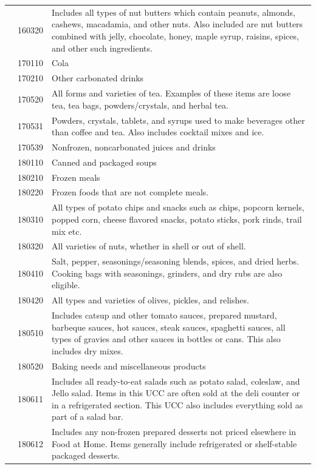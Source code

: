 \documentclass[
]{agujournal2019}
\begin{document}
\begin{table}
{\begin{tabular*}{\linewidth}{@{\extracolsep{\fill}}l|rl}
 & 160320 & Includes all types of nut butters which contain peanuts, almonds, cashews, macadamia, and other nuts. Also included are nut butters combined with jelly, chocolate, honey, maple syrup, raisins, spices, and other such ingredients. \\ 
 & 170110 & Cola \\ 
 & 170210 & Other carbonated drinks \\ 
 & 170520 & All forms and varieties of tea. Examples of these items are loose tea, tea bags, powders/crystals, and herbal tea. \\ 
 & 170531 & Powders, crystals, tablets, and syrups used to make beverages other than coffee and tea. Also includes cocktail mixes and ice. \\ 
 & 170539 & Nonfrozen, noncarbonated juices and drinks \\ 
 & 180110 & Canned and packaged soups \\ 
 & 180210 & Frozen meals \\ 
 & 180220 & Frozen foods that are not complete meals. \\ 
 & 180310 & All types of potato chips and snacks such as chips, popcorn kernels, popped corn, cheese flavored snacks, potato sticks, pork rinds, trail mix etc. \\ 
 & 180320 & All varieties of nuts, whether in shell or out of shell. \\ 
 & 180410 & Salt, pepper, seasonings/seasoning blends, spices, and dried herbs. Cooking bags with seasonings, grinders, and dry rubs are also eligible. \\ 
 & 180420 & All types and varieties of olives, pickles, and relishes. \\ 
 & 180510 & Includes catsup and other tomato sauces, prepared mustard, barbeque sauces, hot sauces, steak sauces, spaghetti sauces, all types of gravies and other sauces in bottles or cans. This also includes dry mixes. \\ 
 & 180520 & Baking needs and miscellaneous products \\ 
 & 180611 & Includes all ready-to-eat salads such as potato salad, coleslaw, and Jello salad. Items in this UCC are often sold at the deli counter or in a refrigerated section. This UCC also includes everything sold as part of a salad bar. \\ 
 & 180612 & Includes any non-frozen prepared desserts not priced elsewhere in Food at Home. Items generally include refrigerated or shelf-stable packaged desserts. \\ 

\end{tabular*}}
\end{table}
\end{document}

